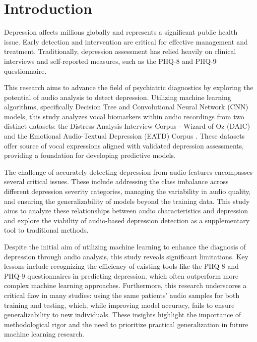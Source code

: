 \section{Introduction}

Depression affects millions globally and represents a significant public health issue\cite{WHO_Mental_Disorders_2019}. Early detection and intervention are critical for effective management and treatment. Traditionally, depression assessment has relied heavily on clinical interviews and self-reported measures, such as the PHQ-8\cite{phq8} and PHQ-9 questionnaire\cite{kroenke2001phq}. 

This research aims to advance the field of psychiatric diagnostics by exploring the potential of audio analysis to detect depression. Utilizing machine learning algorithms, specifically Decision Tree and Convolutional Neural Network (CNN) models, this study analyzes vocal biomarkers within audio recordings from two distinct datasets: the Distress Analysis Interview Corpus - Wizard of Oz (DAIC)\cite{DAICWOZ} and the Emotional Audio-Textual Depression (EATD) Corpus \cite{shen2022automaticdepressiondetectionemotional}. These datasets offer source of vocal expressions aligned with validated depression assessments, providing a foundation for developing predictive models.

The challenge of accurately detecting depression from audio features encompasses several critical issues. These include addressing the class imbalance across different depression severity categories, managing the variability in audio quality, and ensuring the generalizability of models beyond the training data. This study aims to analyze these relationships between audio characteristics and depression and explore the viability of audio-based depression detection as a supplementary tool to traditional methods.

Despite the initial aim of utilizing machine learning to enhance the diagnosis of depression through audio analysis, this study reveals significant limitations. Key lessons include recognizing the efficiency of existing tools like the PHQ-8 and PHQ-9 questionnaires in predicting depression, which often outperform more complex machine learning approaches. Furthermore, this research underscores a critical flaw in many studies: using the same patients' audio samples for both training and testing, which, while improving model accuracy, fails to ensure generalizability to new individuals. These insights highlight the importance of methodological rigor and the need to prioritize practical generalization in future machine learning research.